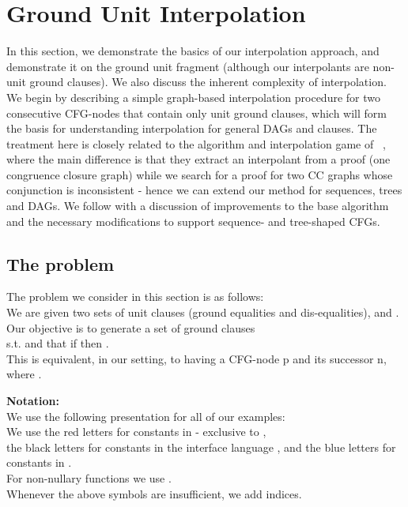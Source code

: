 \newpage
\section{Ground Unit Interpolation}\label{section:scoping:ugfole}
In this section, we demonstrate the basics of our interpolation approach, and demonstrate it on the ground unit fragment (although our interpolants are non-unit ground clauses). We also discuss the inherent complexity of interpolation.
We begin by describing a simple graph-based interpolation procedure for two consecutive CFG-nodes that contain only unit ground clauses, which will form the basis for understanding interpolation for general DAGs and clauses. The treatment here is closely related to the algorithm and interpolation game of ~\cite{FuchsGoelGrundyKrsticTinelli2012}, where the main difference is that they extract an interpolant from a proof (one congruence closure graph) while we search for a proof for two CC graphs whose conjunction is inconsistent - hence we can extend our method for sequences, trees and DAGs.
We follow with a discussion of improvements to the base algorithm and the necessary modifications to support sequence- and tree-shaped CFGs.

\subsection{The problem}
The problem we consider in this section is as follows:\\
We are given two sets of unit clauses (ground equalities and dis-equalities),  and .\\
Our objective is to generate a set of ground clauses \\
 s.t.  and that if  then .\\
This is equivalent, in our setting, to having a CFG-node p and its successor n, where .

\textbf{Notation:}\\
We use the following presentation for all of our examples:\\
We use the red letters \m{\textcolor{red}{u,v,w,x,y,z}} for constants in \langtp - exclusive to ,\\
the black letters  for constants in the interface language \langI, 
and the blue letters \m{\textcolor{blue}{l,m,n,o,p}} for constants in \langbp.\\
For non-nullary functions we use . \\
Whenever the above symbols are insufficient, we add indices.

